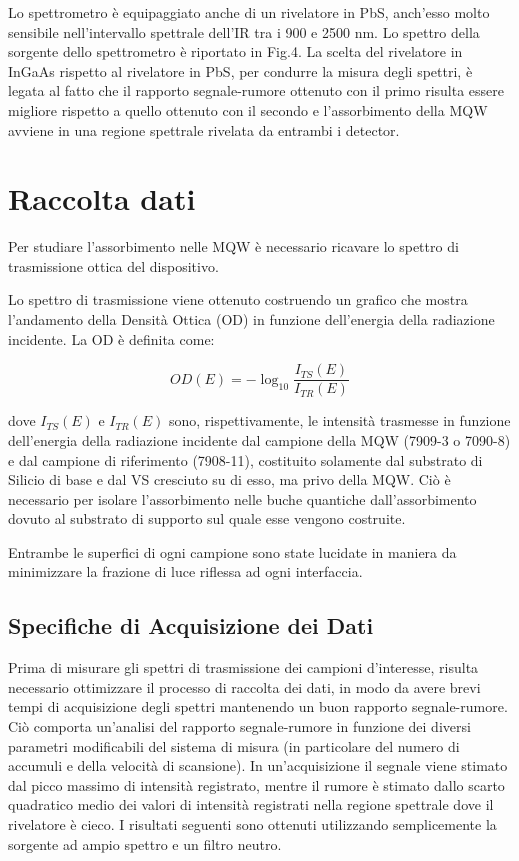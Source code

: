 \documentclass[journal]{IEEEtran}
\begin{document}


Lo spettrometro è equipaggiato anche di un rivelatore in PbS, anch'esso molto sensibile nell'intervallo spettrale dell'IR tra i 900 e 2500 nm. Lo spettro della sorgente dello spettrometro è riportato in Fig.4. La scelta del rivelatore in InGaAs rispetto al rivelatore in PbS, per condurre la misura degli spettri, è legata al fatto che il rapporto segnale-rumore ottenuto con il primo risulta essere migliore rispetto a quello ottenuto con il secondo e l'assorbimento della MQW avviene in una regione spettrale rivelata da entrambi i detector.




\section{Raccolta dati}

Per studiare l'assorbimento nelle MQW è necessario ricavare lo spettro di trasmissione ottica del dispositivo.

Lo spettro di trasmissione viene ottenuto costruendo un grafico che mostra l'andamento della Densità Ottica (OD) in funzione dell'energia della radiazione incidente. La OD è definita come:

\begin{equation}
    OD(E) = - \log_{10}\frac{I_{TS}(E)}{I_{TR}(E)}
\end{equation}

dove $I_{TS}(E)$ e $I_{TR}(E)$ sono, rispettivamente, le intensità trasmesse in funzione dell'energia della radiazione incidente dal campione della MQW (7909-3 o 7090-8) e dal campione di riferimento (7908-11), costituito solamente dal substrato di Silicio di base e dal VS cresciuto su di esso, ma privo della MQW. Ciò è necessario per isolare l'assorbimento nelle buche quantiche dall'assorbimento dovuto al substrato di supporto sul quale esse vengono costruite.

Entrambe le superfici di ogni campione sono state lucidate in maniera da minimizzare la frazione di luce riflessa ad ogni interfaccia.

\subsection{Specifiche di Acquisizione dei Dati}

Prima di misurare gli spettri di trasmissione dei campioni d'interesse, risulta necessario ottimizzare il processo di raccolta dei dati, in modo da avere brevi tempi di acquisizione degli spettri mantenendo un buon rapporto segnale-rumore.
Ciò comporta un'analisi del rapporto segnale-rumore in funzione dei diversi parametri modificabili del sistema di misura (in particolare del numero di accumuli e della velocità di scansione). In un'acquisizione il segnale viene stimato dal picco massimo di intensità registrato, mentre il rumore è stimato dallo scarto quadratico medio dei valori di intensità registrati nella regione spettrale dove il rivelatore è cieco.
I risultati seguenti sono ottenuti utilizzando semplicemente la sorgente ad ampio spettro e un filtro neutro.
\end{document}
